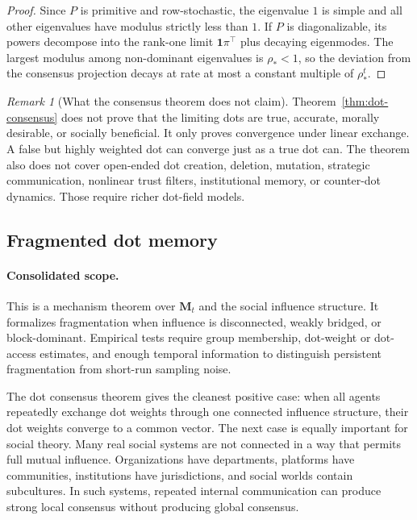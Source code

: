 \documentclass[11pt]{article}
\theoremstyle{remark}
\newtheorem{remark}{Remark}
\begin{document}
\begin{proof}
Since $P$ is primitive and row-stochastic, the eigenvalue $1$ is simple
and all other eigenvalues have modulus strictly less than $1$. If $P$ is
diagonalizable, its powers decompose into the rank-one limit
$\mathbf{1}\pi^\top$ plus decaying eigenmodes. The largest modulus among
non-dominant eigenvalues is $\rho_*<1$, so the deviation from the
consensus projection decays at rate at most a constant multiple of
$\rho_*^t$.
\end{proof}

\begin{remark}[What the consensus theorem does not claim]
Theorem~\ref{thm:dot-consensus} does not prove that the limiting dots
are true, accurate, morally desirable, or socially beneficial. It only
proves convergence under linear exchange. A false but highly weighted
dot can converge just as a true dot can. The theorem also does not cover
open-ended dot creation, deletion, mutation, strategic communication,
nonlinear trust filters, institutional memory, or counter-dot dynamics.
Those require richer dot-field models.
\end{remark}

\subsection{Fragmented dot memory}\label{fragmented-memory}

\paragraph{Consolidated scope.} This is a mechanism theorem over $\mathbf M_t$ and the social influence structure. It formalizes fragmentation when influence is disconnected, weakly bridged, or block-dominant. Empirical tests require group membership, dot-weight or dot-access estimates, and enough temporal information to distinguish persistent fragmentation from short-run sampling noise.

The dot consensus theorem gives the cleanest positive case: when all
agents repeatedly exchange dot weights through one connected influence
structure, their dot weights converge to a common vector. The next case
is equally important for social theory. Many real social systems are not
connected in a way that permits full mutual influence. Organizations
have departments, platforms have communities, institutions have
jurisdictions, and social worlds contain subcultures. In such systems,
repeated internal communication can produce strong local consensus
without producing global consensus.
\end{document}
